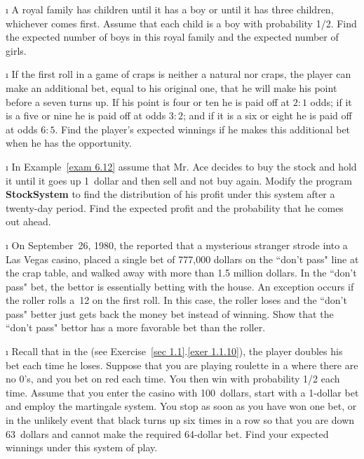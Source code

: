 \begin{LJSItem}
\i\label{exer 6.1.8} A royal family has children until it has a boy or until it
has three children, whichever comes first.  Assume that each child is a boy with
probability 1/2.  Find the expected number of boys in this royal family and the
expected number of girls.

\i\label{exer 6.1.9} If the first roll in a game of craps is neither a natural nor
craps, the player can make an additional bet, equal to his original one, that he will
make his point before a seven turns up.  If his point is four or ten he is paid off
at $2 : 1$ odds; if it is a five or nine he is paid off at odds $3 : 2$; and if it is
a six or eight he is paid off at odds $6 : 5$.  Find the player's expected winnings
if he makes this additional bet when he has the opportunity.

\i\label{exer 6.1.10} In Example~\ref{exam 6.12} assume that Mr. Ace decides to buy the stock
and hold it until it goes up 1~dollar and then sell and not buy again.  Modify the
program {\bf StockSystem} to find the distribution of his profit under this system
after a twenty-day period.  Find the expected profit and the probability that he comes
out ahead.

\i\label{exer 6.1.11} On September~26, 1980, the  reported
that a mysterious stranger strode into a Las Vegas casino, placed a single bet of
777{,}000 dollars on the ``don't pass" line at the crap table, and walked away with
more than 1.5 million dollars.  In the ``don't pass" bet, the bettor is essentially
betting with the house.  An exception occurs if the roller rolls a~12 on the first
roll.  In this case, the roller loses and the ``don't pass" better just gets back
the money bet instead of winning.  Show that the ``don't pass" bettor has a more
favorable bet than the roller.

\i\label{exer 6.1.12} Recall that in the  (see Exercise~\ref{sec 1.1}.\ref{exer 1.1.10}), the player doubles
his bet each time he loses.  Suppose that you are
playing roulette in a  where there are no 0's, and you bet on red
each time.  You then win with probability 1/2 each time.  Assume that you enter the casino with
100~dollars, start with a
1-dollar bet and employ the martingale system.  You stop as soon as you have won one bet, or in the unlikely event that black turns up six times in a
row so that you are down 63~dollars and cannot make the required 64-dollar bet.  Find
your expected winnings under this system of play.


\end{LJSItem}
